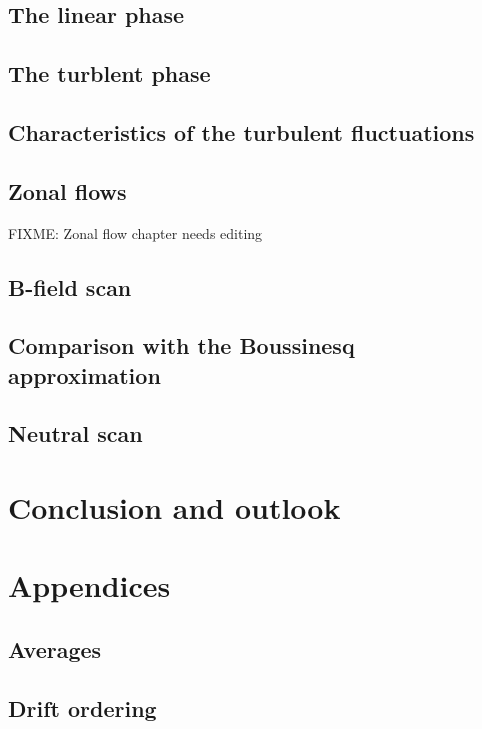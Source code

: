 \documentclass[12pt,a4paper,oneside,openright]{report} %
\begin{document}
\chapter{The linear phase}
\label{chap:linear}

\chapter{The turblent phase}
\label{chap:satTurb}

\chapter{Characteristics of the turbulent fluctuations}
\label{chap:charTurb}



\chapter{Zonal flows}
\label{chap:zonal}
FIXME: Zonal flow chapter needs editing

\chapter{B-field scan}
\label{chap:BFScan}

\chapter{Comparison with the Boussinesq approximation}
\label{chap:compBouss}

\chapter{Neutral scan}
\label{chap:neutScan}


\part{Conclusion and outlook}
\label{part:concl}


\part{Appendices}
\label{part:app}
\appendix
\chapter{Averages}
\label{app:averages}


\chapter{Drift ordering}
\label{app:DO}

\end{document}
